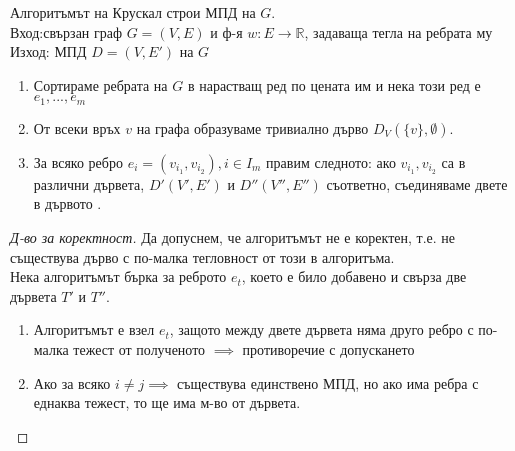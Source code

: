 \begin{alg}[на Крускал]
    Алгоритъмът на Крускал строи МПД на \(G\). \\
    Вход:свързан граф \(G = (V, E)\) и ф-я \(w: E \to \mathbb{R}\), задаваща тегла на ребрата му \\
    Изход: МПД \(D = (V, E')\) на \(G\) \\
    \begin{enumerate}
        \item Сортираме ребрата на \(G\) в нарастващ ред по цената им и нека този ред е \(e_1, ..., e_m\)
        \item От всеки връх \(v\) на графа образуваме тривиално дърво \(D_V(\{v\}, \emptyset)\).
        \item За всяко ребро \(e_i = (v_{i_1}, v_{i_2}), i \in I_m\) правим следното: 
        ако \(v_{i_1}, v_{i_2}\) са в различни дървета, \(D'(V', E')\) и \(D''(V'', E'')\) 
        съответно, съединяваме двете в дървото .
    \end{enumerate}
\end{alg}

\begin{proof}[Д-во за коректност]
    Да допуснем, че алгоритъмът не е коректен, т.е. не съществува дърво с по-малка тегловност от този в 
    алгоритъма. \\
    Нека алгоритъмът бърка за реброто \(e_t\), което е било добавено и свърза две дървета \(T'\) и \(T''\).
    \begin{enumerate}
        \item Алгоритъмът е взел \(e_t\), защото между двете дървета няма друго ребро с по-малка тежест от 
        полученото \(\implies\) противоречие с допускането
        \item Ако  за всяко \(i \not = j \implies\) съществува единствено 
        МПД, но ако има ребра с еднаква тежест, то ще има м-во от дървета.
    \end{enumerate}
\end{proof}
